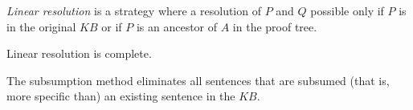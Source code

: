 \documentclass{article}
\begin{document}
\begin{definition}
    \emph{Linear resolution} is a strategy where a resolution of $P$ and $Q$
    possible only if $P$ is in the original $KB$ or if $P$ is an ancestor
    of $A$ in the proof tree.
\end{definition}

\begin{theorem}
    Linear resolution is complete.
\end{theorem}

\begin{definition}
    The subsumption method eliminates all sentences that are subsumed
    (that is, more specific than) an existing sentence in the $KB$.
\end{definition}
\end{document}
